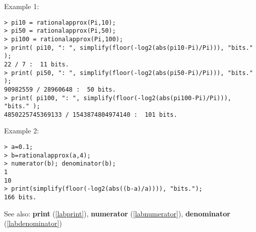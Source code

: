 \noindent Example 1: 
\begin{center}\begin{minipage}{15cm}\begin{Verbatim}[frame=single]
> pi10 = rationalapprox(Pi,10);
> pi50 = rationalapprox(Pi,50);
> pi100 = rationalapprox(Pi,100);
> print( pi10, ": ", simplify(floor(-log2(abs(pi10-Pi)/Pi))), "bits." );
22 / 7 :  11 bits.
> print( pi50, ": ", simplify(floor(-log2(abs(pi50-Pi)/Pi))), "bits." );
90982559 / 28960648 :  50 bits.
> print( pi100, ": ", simplify(floor(-log2(abs(pi100-Pi)/Pi))), "bits." );
4850225745369133 / 1543874804974140 :  101 bits.
\end{Verbatim}
\end{minipage}\end{center}
\noindent Example 2: 
\begin{center}\begin{minipage}{15cm}\begin{Verbatim}[frame=single]
> a=0.1;
> b=rationalapprox(a,4);
> numerator(b); denominator(b);
1
10
> print(simplify(floor(-log2(abs((b-a)/a)))), "bits.");
166 bits.
\end{Verbatim}
\end{minipage}\end{center}
See also: \textbf{print} (\ref{labprint}), \textbf{numerator} (\ref{labnumerator}), \textbf{denominator} (\ref{labdenominator})
